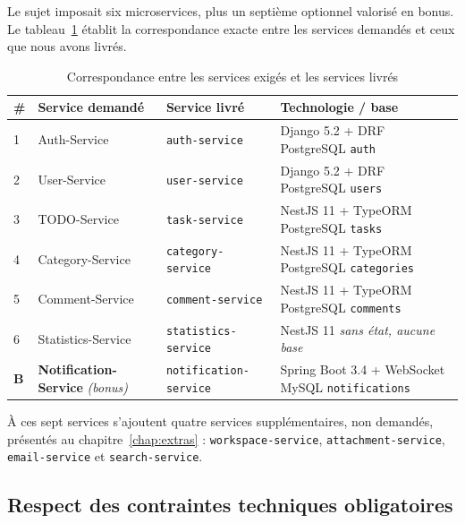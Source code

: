 \documentclass[11pt,a4paper,oneside]{report}
\newcommand{\code}[1]{\texttt{\small #1}}
\begin{document}
Le sujet imposait six microservices, plus un septième optionnel valorisé en
bonus. Le tableau~\ref{tab:mapping} établit la correspondance exacte entre les
services demandés et ceux que nous avons livrés.

\begin{table}[H]
\centering
\small
\begin{tabularx}{\linewidth}{@{}p{0.5cm}p{3.4cm}p{3.5cm}X@{}}
\toprule
\textbf{\#} & \textbf{Service demandé} & \textbf{Service livré} & \textbf{Technologie / base} \\
\midrule
1 & Auth-Service       & \code{auth-service}       & Django 5.2 + DRF \textbullet{} PostgreSQL \code{auth} \\
2 & User-Service       & \code{user-service}       & Django 5.2 + DRF \textbullet{} PostgreSQL \code{users} \\
3 & TODO-Service       & \code{task-service}       & NestJS 11 + TypeORM \textbullet{} PostgreSQL \code{tasks} \\
4 & Category-Service   & \code{category-service}   & NestJS 11 + TypeORM \textbullet{} PostgreSQL \code{categories} \\
5 & Comment-Service    & \code{comment-service}    & NestJS 11 + TypeORM \textbullet{} PostgreSQL \code{comments} \\
6 & Statistics-Service & \code{statistics-service} & NestJS 11 \textbullet{} \emph{sans état, aucune base} \\
\midrule
\textbf{B} & \textbf{Notification-Service} \newline \emph{(bonus)} & \code{notification-service} & Spring Boot 3.4 + WebSocket \textbullet{} MySQL \code{notifications} \\
\bottomrule
\end{tabularx}
\caption{Correspondance entre les services exigés et les services livrés}
\label{tab:mapping}
\end{table}

À ces sept services s'ajoutent quatre services supplémentaires, non demandés,
présentés au chapitre~\ref{chap:extras} : \code{workspace-service},
\code{attachment-service}, \code{email-service} et \code{search-service}.

\subsection{Respect des contraintes techniques obligatoires}
\end{document}
